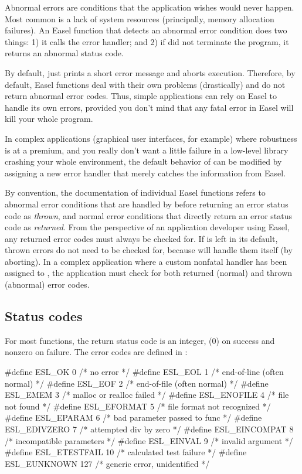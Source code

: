 \documentclass[11pt]{article}
\begin{document}
Abnormal errors are conditions that the application wishes would never
happen. Most common is a lack of system resources (principally, memory
allocation failures). An Easel function that detects an abnormal error
condition does two things: 1) it calls the  error
handler; and 2) if  did not terminate the program,
it returns an abnormal status code.

By default,  just prints a short error message and
aborts execution. Therefore, by default, Easel functions deal with
their own problems (drastically) and do not return abnormal error
codes. Thus, simple applications can rely on Easel to handle its own
errors, provided you don't mind that any fatal error in Easel will
kill your whole program.

In complex applications (graphical user interfaces, for example) where
robustness is at a premium, and you really don't want a little failure
in a low-level library crashing your whole environment, the default
behavior of  can be modified by assigning a new
error handler that merely catches the information from Easel.

By convention, the documentation of individual Easel functions refers
to abnormal error conditions that are handled by 
before returning an error status code as \emph{thrown}, and normal
error conditions that directly return an error status code as
\emph{returned}.  From the perspective of an application developer
using Easel, any returned error codes must always be checked for. If
 is left in its default, thrown errors do not need
to be checked for, because  will handle them itself
(by aborting). In a complex application where a custom nonfatal
handler has been assigned to , the application
must check for both returned (normal) and thrown (abnormal) error
codes.

\subsection{Status codes}

For most functions, the return status code is an integer,
 (0) on success and nonzero on failure. The error
codes are defined in :

\begin{cchunk}
#define ESL_OK         0	/* no error                     */
#define ESL_EOL        1	/* end-of-line (often normal)   */
#define ESL_EOF        2	/* end-of-file (often normal)   */
#define ESL_EMEM       3	/* malloc or realloc failed     */
#define ESL_ENOFILE    4	/* file not found               */
#define ESL_EFORMAT    5	/* file format not recognized   */
#define ESL_EPARAM     6	/* bad parameter passed to func */
#define ESL_EDIVZERO   7	/* attempted div by zero        */
#define ESL_EINCOMPAT  8	/* incompatible parameters      */
#define ESL_EINVAL     9	/* invalid argument             */
#define ESL_ETESTFAIL  10	/* calculated test failure      */
#define ESL_EUNKNOWN   127      /* generic error, unidentified  */
\end{cchunk}
\end{document}
